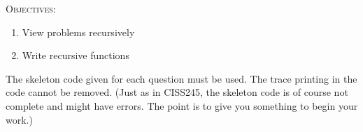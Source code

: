 


\renewcommand\TITLE{Assignment 3}


\topmatter

\textsc{Objectives:}
\begin{enumerate}[topsep=0pt]
\item View problems recursively
\item Write recursive functions
\end{enumerate}


The skeleton code given for each question must be used.
The trace printing in the code cannot be removed.
(Just as in CISS245, the skeleton code is of course not complete
and might have errors. The point is to give you something to begin your
work.)

\begin{comment}

Q1. [Review of CISS245]

Write a matrix class of \texttt{double}s.
You should have addition, subtraction, multiplication,
scalar multiplication, etc.
You can also compare matrices: \verb!==! and \verb@!=@.
You can get the number of rows and number of columns using
\verb!m.nroww()!
and
\verb!m.ncols()!
If you are not familiar with matrix multiplication,
check online or see below.
Also, write the the determinant function.
\begin{Verbatim}[frame=single]
Mat m0(3, 4);    // 3-by-4 matrix
Mat m1(3, 4, 0); // 3-by-4 matrix of zeroes
m0(1, 2) = 5.0;  // Set row 1, column 2 to 5.0
Mat m2 = m0;     // The obvious copy constructor
m2 += m1;        // The obvious += operator
m2 = m2 + m1;
m2 -= m1;
m2 = m2 - m1;

Mat m3(4, 3, 2); // 4-by-3 matrix of 2s
Mat m4(3, 3);
m4 = m2 * m3;

m4 = 0.5 * m4;
m4 = m4 * 0.5;
m4 *= 0.5;

Mat m5 = Mat::identity(3); // m5 is 3-by-3 identity matrix

double x[] = {1.1, 2.2, 3.3, 4.4, 5.5, 6.6};
Mat m6(2, 3, x); // m6 is 2-by-3 filled with values from x
\end{Verbatim}
For output, if \verb!m! models this array
\[
\begin{bmatrix}
1 & 2 & 3.3 \\
4.56 & 5 & 6 
\end{bmatrix}
\]
the output should be
\begin{Verbatim}
[[   1 2 3.3]
 [4.56 5   6]]
\end{Verbatim}
(For the output, go online and check C++ string stream class.
You can cout the values of the matrix to a string stream object
which will then give you the lengths of the output of all entries.)
\end{comment}




